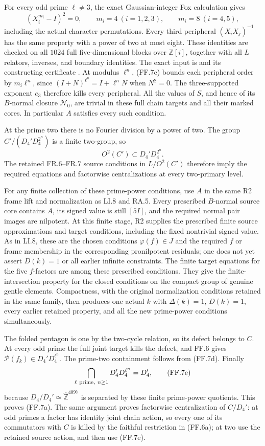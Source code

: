For every odd prime $\ell\ne3$, the exact Gaussian-integer
Fox calculation gives
\[
       (X_i^{m_i}-I)^2=0,\qquad
       m_i=4\ (i=1,2,3),\qquad m_i=8\ (i=4,5),
 \tag{FF.7c}
\]
including the actual character permutations. Every third
peripheral $(X_iX_j)^{-1}$ has the same property with a
power of two at most eight. These identities are checked
on all $1024$ full five-dimensional blocks over
$\mathbb Z[i]$, together with all $L$ relators, inverses,
and boundary identities. The exact input is
and its constructing certificate
.
At modulus $\ell^n$, (FF.7c) bounds each peripheral order
by $m_i\ell^n$, since $(I+N)^{\ell^n}=I+\ell^nN$ when
$N^2=0$. The three-supported exponent $e_3$ therefore
kills every peripheral. All the values of $S$, and hence
of its $B$-normal closure $\mathcal N_0$, are trivial in
these full chain targets and all their marked cores.
In particular $A$ satisfies every such condition.

At the prime two there is no Fourier division by a power
of two. The group
$C'/(D_4'D_4^{2^n})$ is a finite two-group, so
\[
                    O^2(C')\subset D_4'D_4^{2^n}.
 \tag{FF.7d}
\]
The retained FR.6--FR.7 source conditions in $L/O^2(C')$
therefore imply the required equations and factorwise
centralizations at every two-primary level.

For any finite collection of these prime-power conditions,
use $A$ in the same R2 frame lift and normalization as LI.8
and RA.5. Every prescribed $B$-normal source core contains
$A$, its signed value is still $[5I]$, and the required
normal pair images are nilpotent. At this finite stage,
R2 supplies the prescribed finite source approximations
and target conditions, including the fixed nontrivial
signed value. As in LI.8, these are the chosen conditions
$\varphi(f)\in J$ and the required $f$ or frame membership
in the corresponding pronilpotent residuals; one does not
yet assert $D(k)=1$ or all earlier infinite constraints.
The finite target equations for the five $f$-factors are
among these prescribed conditions. They give the
finite-intersection property for the closed conditions
on the compact group of genuine gentle elements.
Compactness, with the original normalization conditions
retained in the same family, then produces one actual
$k$ with $\Delta(k)=1$, $D(k)=1$, every earlier retained
property, and all the new prime-power conditions
simultaneously.

The folded pentagon is one by the two-cycle relation, so
its defect belongs to $C$. At every odd prime the full
joint target kills the defect, and FF.6 gives
$\mathcal P(f_k)\in D_4'D_4^{\ell^n}$. The prime-two
containment follows from (FF.7d). Finally
\[
             \bigcap_{\ell\ {\rm prime},\ n\geq1}
                    D_4'D_4^{\ell^n}=D_4',
 \tag{FF.7e}
\]
because $D_4/D_4'\simeq\widehat{\mathbb Z}^{4097}$ is
separated by these finite prime-power quotients. This proves
(FF.7a). The same argument proves factorwise centralization
of $C/D_4'$: at odd primes a factor has identity joint
chain action, so every one of its commutators with $C$ is
killed by the faithful restriction in (FF.6a); at two use
the retained source action, and then use (FF.7e).


